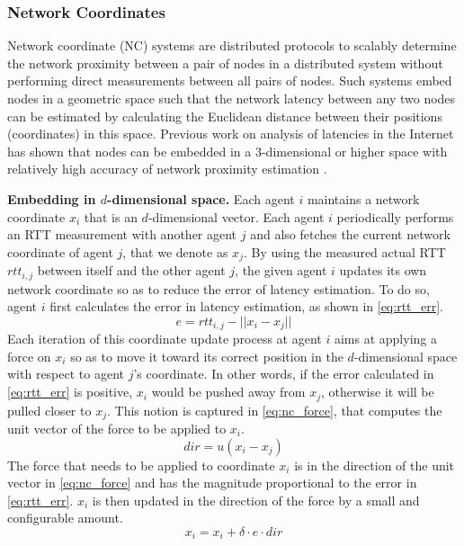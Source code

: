 \subsubsection{Network Coordinates}
Network coordinate (NC) systems are distributed protocols to scalably determine the network proximity between a pair of nodes in a distributed system without performing direct measurements \cite{donnet2010survey} between all pairs of nodes. Such systems embed nodes in a geometric space such that the network latency between any two nodes can be estimated by calculating the Euclidean distance between their positions (coordinates) in this space. Previous work on analysis of latencies in the Internet has shown that nodes can be embedded in a 3-dimensional or higher space with relatively high accuracy of network proximity estimation \cite{lee2009suitability}.
\par \noindent \textbf{Embedding in $d$-dimensional space. } Each agent $i$ maintains a network coordinate $x_i$ that is an $d$-dimensional vector. Each agent $i$ periodically performs an RTT measurement with another agent $j$ and also fetches the current network coordinate of agent $j$, that we denote as $x_j$. By using the measured actual RTT $rtt_{i,j}$ between itself and the other agent $j$, the given agent $i$ updates its own network coordinate so as to reduce the error of latency estimation. To do so, agent $i$ first calculates the error in latency estimation, as shown in \cref{eq:rtt_err}.
\begin{equation}
e = rtt_{i,j} - || x_i - x_j ||
\label{eq:rtt_err}
\end{equation}
Each iteration of this coordinate update process at agent $i$ aims at applying a force on $x_i$ so as to move it toward its correct position in the $d$-dimensional space with respect to agent $j$'s coordinate. In other words, if the error calculated in \cref{eq:rtt_err} is positive, $x_i$ would be pushed away from $x_j$, otherwise it will be pulled closer to $x_j$. This notion is captured in \cref{eq:nc_force}, that computes the unit vector of the force to be applied to $x_i$.
\begin{equation}
dir = u \left( x_i - x_j \right) 
\label{eq:nc_force}
\end{equation}
The force that needs to be applied to coordinate $x_i$ is in the direction of the unit vector in \cref{eq:nc_force} and has the magnitude proportional to the error in \cref{eq:rtt_err}. $x_i$ is then updated in the direction of the force by a small and configurable amount.
\begin{equation}
x_i = x_i + \delta \cdot e \cdot dir 
\label{eq:nc_update}
\end{equation}

